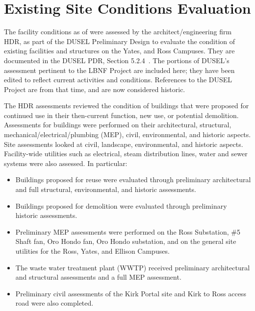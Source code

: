 \section{Existing  Site Conditions Evaluation}
\label{sec:fscf-site-cond-eval}

The facility conditions as of  
were assessed by the architect/engineering firm HDR, as part of the DUSEL Preliminary Design to
evaluate the condition of existing facilities and structures on the Yates, and Ross Campuses.
They are documented in the DUSEL PDR, Section 5.2.4~\cite{dusel-pdr}. 
The portions of DUSEL's assessment pertinent to the LBNF Project are included here; they have been edited to reflect current activities and conditions. References to the DUSEL Project are from that time, and are now considered historic.


The HDR assessments reviewed the condition of buildings that were proposed for %
continued use in their then-current function, new use, or potential demolition. Assessments for buildings were performed %
on their architectural, structural, mechanical/electrical/plumbing (MEP), civil, environmental, and historic aspects. Site assessments looked at %
civil, landscape, environmental, and historic aspects. Facility-wide utilities such as electrical, steam distribution lines, water and sewer systems were also assessed. In particular:

\begin{itemize} 
\item Buildings proposed for reuse were evaluated through preliminary architectural and full structural, environmental, and historic assessments. 
\item Buildings proposed for demolition were evaluated through preliminary historic assessments.
\item Preliminary MEP assessments were performed on the Ross Substation, \#5 Shaft fan, Oro Hondo fan, Oro Hondo substation, and on the general site utilities for the Ross, Yates, and Ellison Campuses.
 \item The waste water treatment plant (WWTP) received preliminary architectural and structural assessments and a full MEP assessment.
 \item Preliminary civil assessments of the Kirk Portal site and Kirk to Ross access road were also completed.
 \end{itemize}

